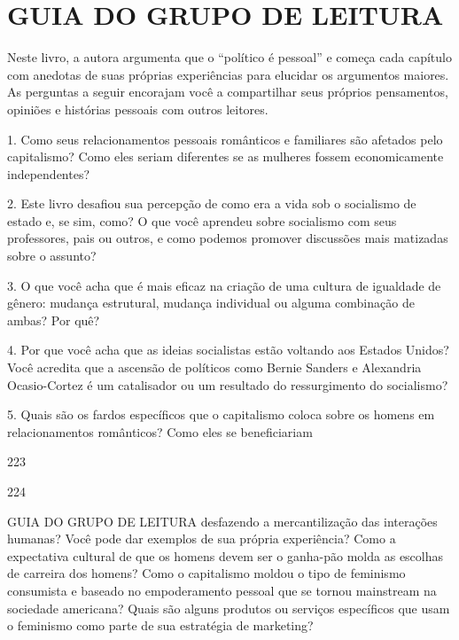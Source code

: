 \chapter{GUIA DO GRUPO DE LEITURA}\label{GUIA DO GRUPO DE LEITURA}
 \par 
Neste livro, a autora argumenta que o “político é pessoal” e começa cada capítulo com anedotas de suas próprias experiências para elucidar os argumentos maiores. As perguntas a seguir encorajam você a compartilhar seus próprios pensamentos, opiniões e histórias pessoais com outros leitores.
 \par 
1. Como seus relacionamentos pessoais românticos e familiares são afetados pelo capitalismo? Como eles seriam diferentes se as mulheres fossem economicamente independentes?
 \par 
2. Este livro desafiou sua percepção de como era a vida sob o socialismo de estado e, se sim, como? O que você aprendeu sobre socialismo com seus professores, pais ou outros, e como podemos promover discussões mais matizadas sobre o assunto?
 \par 
3. O que você acha que é mais eficaz na criação de uma cultura de igualdade de gênero: mudança estrutural, mudança individual ou alguma combinação de ambas? Por quê?
 \par 
4. Por que você acha que as ideias socialistas estão voltando aos Estados Unidos? Você acredita que a ascensão de políticos como Bernie Sanders e Alexandria Ocasio-Cortez é um catalisador ou um resultado do ressurgimento do socialismo?
 \par 
5. Quais são os fardos específicos que o capitalismo coloca sobre os homens em relacionamentos românticos? Como eles se beneficiariam
 \par 
223
 \par 
224
 \par 
GUIA DO GRUPO DE LEITURA desfazendo a mercantilização das interações humanas? Você pode dar exemplos de sua própria experiência? Como a expectativa cultural de que os homens devem ser o ganha-pão molda as escolhas de carreira dos homens? Como o capitalismo moldou o tipo de feminismo consumista e baseado no empoderamento pessoal que se tornou mainstream na sociedade americana? Quais são alguns produtos ou serviços específicos que usam o feminismo como parte de sua estratégia de marketing?
 \par 
